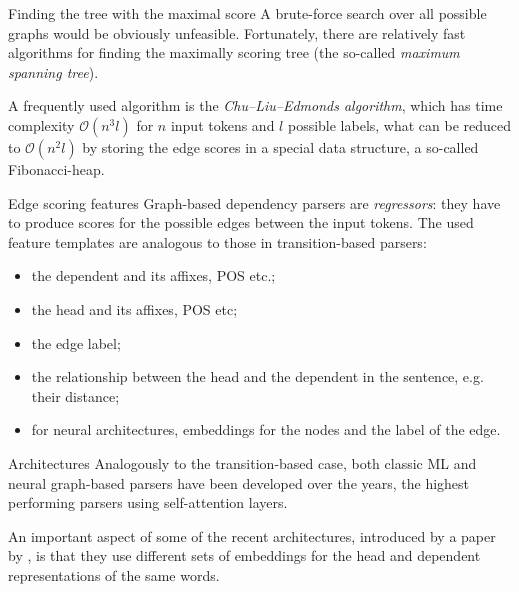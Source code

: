 \documentclass[style=upen, size=14pt]{powerdot}
\newcommand{\gold}{\color{arany}}
\theoremstyle{definition}
\begin{document}
\begin{slide}[toc=Finding the maximum spanning tree]{Finding the tree with the
    maximal score}
  A brute-force search over all possible graphs would be obviously unfeasible.
  Fortunately, there are relatively fast algorithms for finding the maximally
  scoring tree (the so-called \emph{maximum spanning tree}). \bigskip

  A frequently used algorithm is the \emph{\gold Chu--Liu--Edmonds algorithm},
  which has time complexity $\mathcal O( n^3 l)$ for $n$ input tokens and $l$
  possible labels, what can be reduced to $\mathcal O(n^2l)$ by storing the edge
  scores in a special data structure, a so-called Fibonacci-heap.
\end{slide}

\begin{slide}[toc=Edge features]{Edge scoring features}
  Graph-based dependency parsers are \emph{regressors}: they have to produce
  scores for the possible edges between the input tokens. The used feature
  templates are analogous to those in transition-based parsers:
  \begin{itemize}
  \item the dependent and its affixes, POS etc.;
  \item the head and its affixes, POS etc;
  \item the edge label;
  \item the relationship between the head and the dependent in the sentence,
    e.g. their distance;
  \item for neural architectures, embeddings for the nodes and the label of the
    edge.
  \end{itemize}
\end{slide}

\begin{slide}{Architectures}
  Analogously to the transition-based case, both classic ML and neural
  graph-based parsers have been developed over the years, the highest performing
  parsers using self-attention layers.\bigskip

  An important aspect of some of the recent architectures, introduced by a paper
  by \cite{dozat2016deep}, is that they use different sets of embeddings for the
  head and dependent representations of the same words.
\end{slide}
\end{document}
